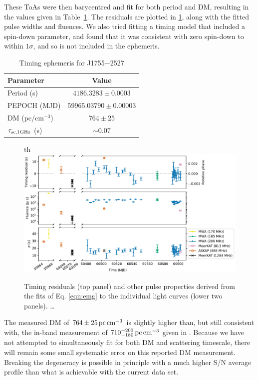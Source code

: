 \documentclass[fleqn,usenatbib]{mnras}
\newcommand{\src}{J1755$-$2527}
\newcommand{\Tab}{Table}
\begin{document}
These ToAs were then barycentred and fit for both period and DM, resulting in the values given in \Tab~\ref{tbl:ephemeris}.
The residuals are plotted in \ref{fig:pulse_details}, along with the fitted pulse widths and fluences.
We also tried fitting a timing model that included a spin-down parameter, and found that it was consistent with zero spin-down to within $1\sigma$, and so is not included in the ephemeris.

\begin{table}
  \centering
  \caption{Timing ephemeris for \src{}}
  \label{tbl:ephemeris}
  \begin{tabular}{lc}
    \hline
    Parameter & Value \\
    \hline
    Period (s) & $4186.3283 \pm 0.0003$ \\
    PEPOCH (MJD) & $59965.03790 \pm 0.00003$ \\
    DM (pc/cm$^{-3}$) & $764 \pm 25$ \\
    $\tau_{\rm sc,1 GHz}$ (s) & ${\sim}0.07$ \\
    \hline
  \end{tabular}
\end{table}

\begin{figure}{th}
  \centering
  \includegraphics[width=0.98\linewidth]{pulse_details.pdf}
  \caption{Timing residuals (top panel) and other pulse properties derived from the fits of Eq. \eqref{eqn:emg} to the individual light curves (lower two panels). \dots}
  \label{fig:pulse_details}
\end{figure}

The measured DM of $764 \pm 25\,{\rm pc}\,{\rm cm}^{-3}$ is slightly higher than, but still consistent with, the in-band measurement of $710^{+200}_{-180}\,{\rm pc}\,{\rm cm}^{-3}$ given in .
Because we have not attempted to simultaneously fit for both DM and scattering timescale, there will remain some small systematic error on this reported DM measurement.
Breaking the degeneracy is possible in principle with a much higher S/N average profile than what is achievable with the current data set.
\end{document}
